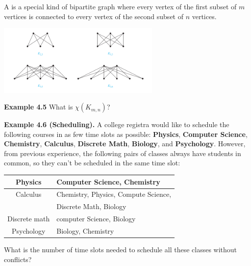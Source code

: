 \documentclass[aspectratio=169]{beamer}
\begin{document}
 
 
 \begin{frame}[plain]{}
 
  A  is
  a special kind of bipartite graph where every vertex of the first subset
  of $m$ vertices is connected 
  to every vertex of the second subset of $n$ vertices.  
  \begin{center}
         \includegraphics[height=3.5cm]{./img/lecture4-fig6.png}
       \end{center}
  
 {\bf Example 4.5} What is $\chi(K_{m,n})$? %
\vspace{.3in}

\end{frame}

\begin{frame}[plain]{}

  {\bf Example 4.6 (Scheduling).}
   A college registra would like to schedule the following courses in 
    as few time slots as possible: {\bf Physics}, {\bf Computer Science}, 
      {\bf Chemistry}, {\bf Calculus}, {\bf Discrete Math}, {\bf Biology},
      and {\bf Psychology}. However, from previous experience, the following
      pairs of classes always have students in common, so they can't be scheduled
      in the same time slot:
      \medskip
      
      \begin{center}
      \begin{tabular}{|c|l|} \hline
       Physics  & Computer Science, Chemistry \\ \hline
       Calculus & Chemistry, Physics, Compute Science, \\ 
                &  Discrete Math, Biology \\ \hline
       Discrete math & computer Science, Biology \\ \hline
       Psychology & Biology, Chemistry \\ \hline
      \end{tabular}
      \end{center}
      
    What is the  number of time slots needed to schedule all these classes without conflicts? 
 
\end{frame}
\end{document}
